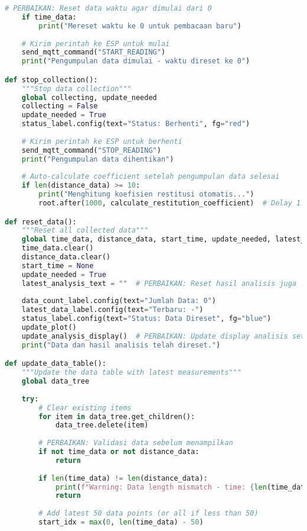 \begin{itemize}
\begin{scriptsize}
\begin{lstlisting}[language=python]
    # PERBAIKAN: Reset data waktu agar dimulai dari 0
    if time_data:
        print("Mereset waktu ke 0 untuk pembacaan baru")
    
    # Kirim perintah ke ESP untuk mulai
    send_mqtt_command("START_READING")
    print("Pengumpulan data dimulai - waktu direset ke 0")

def stop_collection():
    """Stop data collection"""
    global collecting, update_needed
    collecting = False
    update_needed = True
    status_label.config(text="Status: Berhenti", fg="red")
    
    # Kirim perintah ke ESP untuk berhenti
    send_mqtt_command("STOP_READING")
    print("Pengumpulan data dihentikan")
    
    # Auto-calculate coefficient setelah pengumpulan data selesai
    if len(distance_data) >= 10:
        print("Menghitung koefisien restitusi otomatis...")
        root.after(1000, calculate_restitution_coefficient)  # Delay 1 detik untuk memastikan plot terupdate

def reset_data():
    """Reset all collected data"""
    global time_data, distance_data, start_time, update_needed, latest_analysis_text
    time_data.clear()
    distance_data.clear()
    start_time = None
    update_needed = True
    latest_analysis_text = ""  # PERBAIKAN: Reset hasil analisis juga
    
    data_count_label.config(text="Jumlah Data: 0")
    latest_data_label.config(text="Terbaru: -")
    status_label.config(text="Status: Data Direset", fg="blue")
    update_plot()
    update_analysis_display()  # PERBAIKAN: Update display analisis setelah reset
    print("Data dan hasil analisis telah direset.")

def update_data_table():
    """Update the data table with latest measurements"""
    global data_tree
    
    try:
        # Clear existing items
        for item in data_tree.get_children():
            data_tree.delete(item)
        
        # PERBAIKAN: Validasi data sebelum menampilkan
        if not time_data or not distance_data:
            return
        
        if len(time_data) != len(distance_data):
            print(f"Warning: Data length mismatch - time: {len(time_data)}, distance: {len(distance_data)}")
            return
        
        # Add latest 50 data points (or all if less than 50)
        start_idx = max(0, len(time_data) - 50)
        

\end{lstlisting}
\end{scriptsize}
\end{itemize}
